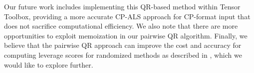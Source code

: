 \documentclass{article}
\begin{document}
Our future work includes implementing this QR-based method within Tensor Toolbox, providing a more accurate CP-ALS approach for CP-format input that does not sacrifice computational efficiency.
We also note that there are more opportunities to exploit memoization in our pairwise QR algorithm.
Finally, we believe that the pairwise QR approach can improve the cost and accuracy for computing leverage scores for randomized methods as described in \cite{bharadwaj2023fast}, which we would like to explore further.




\end{document}
